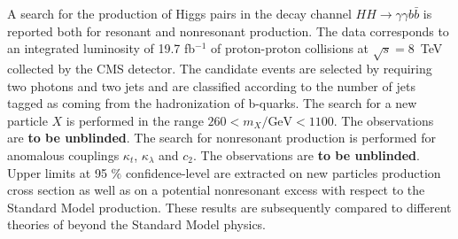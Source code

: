 A search for the production of Higgs pairs in the decay channel
$HH \rightarrow \gamma\gamma b\bar{b}$ is reported both for
resonant and nonresonant production. The data corresponds to an integrated
luminosity of 19.7 fb$^{-1}$ of proton-proton collisions at $\sqrt{s}=8$~TeV collected by the
CMS detector. The candidate events are selected by requiring two photons and two jets and are classified
according to the number of jets tagged as coming from the hadronization of b-quarks.
The search for a new particle $X$ is performed in the range $260 < m_X/\text{GeV} < 1100$.
The observations
are {\bf to be unblinded}.
The search for nonresonant production is performed for anomalous couplings
$\kappa_{t}$, $\kappa_{\lambda}$ and $c_2$.
The observations are {\bf to be unblinded}.
Upper limits at 95 $\%$ confidence-level are extracted on new particles production cross section
as well as on a potential nonresonant excess with respect to the Standard Model production.
These results are subsequently compared to different theories of beyond the Standard Model physics.
